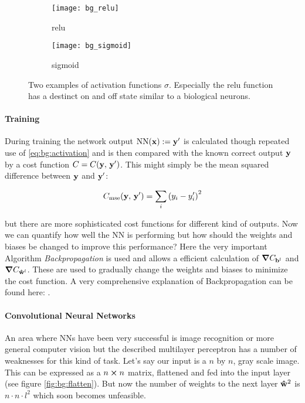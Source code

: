 \begin{figure}[H]
\centering
\begin{subfigure}{.5\textwidth}
    \centering
    \texttt{[image: bg\_relu]}
    \caption{relu}
    \label{}
\end{subfigure}%
\begin{subfigure}{.5\textwidth}
    \centering
    \texttt{[image: bg\_sigmoid]}
    \caption{sigmoid}
    \label{}
\end{subfigure}
\caption{Two examples of activation functions $\sigma$. Especially the relu function has a destinct on and off state similar to a biological neurons.}
\label{}
\end{figure}

\paragraph{Training}
During training the network output $\mathrm{NN}(\vb x) := \vb{y}' $ is calculated though repeated use of \eqref{eq:bg:activation} and is then compared with the known correct output $\vb y$ by a cost function $C = C(\vb y, \, \vb y')$. This might simply be the mean squared difference between $\vb y$ and $\vb y'$:

\begin{equation}
    C_{\mathrm{mse}}(\vb y, \, \vb y') = \sum_i \qty(y_i - y_i')^2
\end{equation}

\noindent
but there are more sophisticated cost functions for different kind of outputs. Now we can quantify how well the NN is performing but how should the weights and biases be changed to improve this performance?
Here the very important Algorithm \textit{Backpropagation} is used and allows a efficient calculation of $\grad{C}_{\vb{b}^l}$ and $\grad{C}_{\vu{w}^l}$. These are used to gradually change the weights and biases to minimize the cost function. A very comprehensive explanation of Backpropagation can be found here: \cite{backprop}.

\paragraph{Convolutional Neural Networks}
An area where NNs have been very successful is image recognition or more general computer vision but the described multilayer perceptron has a number of weaknesses for this kind of task. Let's say our input is a $n$ by $n$, gray scale image. This can be expressed as a $n \cp n$ matrix, flattened and fed into the input layer (see figure \ref{fig:bg:flatten}). But now the number of weights to the next layer $\vu{w}^2$ is $n \cdot n \cdot l^2$
which soon becomes unfeasible.

